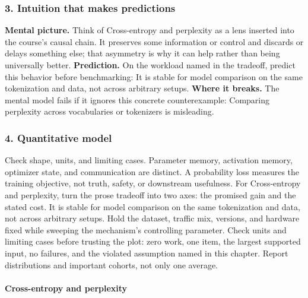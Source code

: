\subsubsection*{3. Intuition that makes predictions}
\textbf{Mental picture.} Think of Cross-entropy and perplexity as a lens inserted into the course's causal chain. It preserves some information or control and discards or delays something else; that asymmetry is why it can help rather than being universally better.
\textbf{Prediction.} On the workload named in the tradeoff, predict this behavior before benchmarking: It is stable for model comparison on the same tokenization and data, not across arbitrary setups.
\textbf{Where it breaks.} The mental model fails if it ignores this concrete counterexample: Comparing perplexity across vocabularies or tokenizers is misleading.
\subsubsection*{4. Quantitative model}
Check shape, units, and limiting cases. Parameter memory, activation memory, optimizer state, and communication are distinct. A probability loss measures the training objective, not truth, safety, or downstream usefulness.
For Cross-entropy and perplexity, turn the prose tradeoff into two axes: the promised gain and the stated cost. It is stable for model comparison on the same tokenization and data, not across arbitrary setups. Hold the dataset, traffic mix, versions, and hardware fixed while sweeping the mechanism's controlling parameter.
Check units and limiting cases before trusting the plot: zero work, one item, the largest supported input, no failures, and the violated assumption named in this chapter. Report distributions and important cohorts, not only one average.
\paragraph{Cross-entropy and perplexity}
